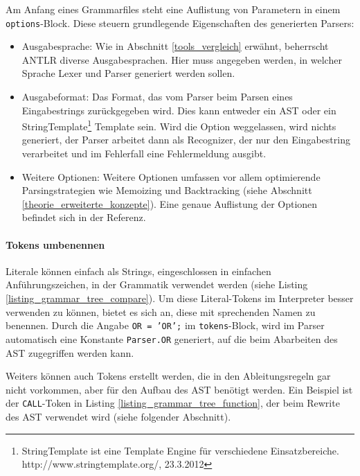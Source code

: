 Am Anfang eines Grammarfiles steht eine Auflistung von Parametern in einem \texttt{options}-Block. Diese steuern grundlegende Eigenschaften des generierten Parsers:

\begin{itemize}
  \item Ausgabesprache: Wie in Abschnitt \ref{tools_vergleich} erwähnt, beherrscht ANTLR diverse Ausgabesprachen. Hier muss angegeben werden, in welcher Sprache Lexer und Parser generiert werden sollen.

  \item Ausgabeformat: Das Format, das vom Parser beim Parsen eines Eingabestrings zurückgegeben wird. Dies kann entweder ein AST oder ein StringTemplate\footnote{StringTemplate ist eine Template Engine für verschiedene Einsatzbereiche. http://www.stringtemplate.org/, 23.3.2012} Template sein. Wird die Option weggelassen, wird nichts generiert, der Parser arbeitet dann als Recognizer, der nur den Eingabestring verarbeitet und im Fehlerfall eine Fehlermeldung ausgibt.

  \item Weitere Optionen: Weitere Optionen umfassen vor allem optimierende Parsingstrategien wie Memoizing und Backtracking (siehe Abschnitt \ref{theorie_erweiterte_konzepte}). Eine genaue Auflistung der Optionen befindet sich in der Re\-fe\-renz\cite{Parr07}.
\end{itemize}



\paragraph{Tokens umbenennen}

Literale können einfach als Strings, eingeschlossen in einfachen Anführungszeichen, in der Grammatik verwendet werden (siehe Listing \ref{listing_grammar_tree_compare}). Um diese Literal-Tokens im Interpreter besser verwenden zu können, bietet es sich an, diese mit sprechenden Namen zu benennen. Durch die Angabe \texttt{OR = 'OR';} im \texttt{tokens}-Block, wird im Parser automatisch eine Konstante \texttt{Parser.OR} generiert, auf die beim Abarbeiten des AST zugegriffen werden kann.

Weiters können auch Tokens erstellt werden, die in den Ab\-lei\-tungs\-re\-geln gar nicht vorkommen, aber für den Aufbau des AST benötigt werden. Ein Beispiel ist der \texttt{CALL}-Token in Listing \ref{listing_grammar_tree_function}, der beim Rewrite des AST verwendet wird (siehe folgender Abschnitt).

